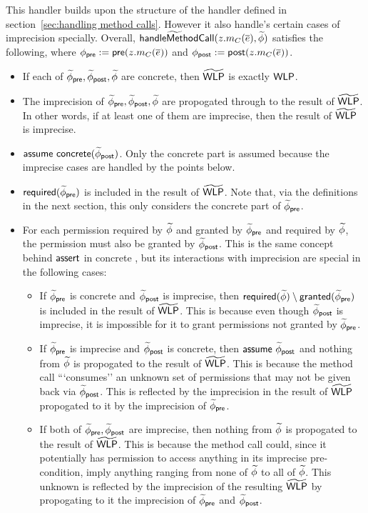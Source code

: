 This handler builds upon the structure of the handler defined in section~\ref{sec:handling method calls}. However it also handle's certain cases of imprecision specially. Overall, $\textsf{handle}\widetilde{\textsf{Met}}\textsf{hodCall}(z.m_C(\overline{e}), \widetilde{\phi})$ satisfies the following, where $\phi_\textsf{pre} := \textsf{pre}(z.m_C(\overline{e}))$ and $\phi_\textsf{post} := \textsf{post}(z.m_C(\overline{e}))$.
\begin{itemize}

\item
  If each of $\widetilde{\phi}_\textsf{pre}, \widetilde{\phi}_\textsf{post}, \widetilde{\phi}$ are concrete, then $\widetilde{\textsf{WLP}}$ is exactly $\textsf{WLP}$.

\item
  The imprecision of $\widetilde{\phi}_\textsf{pre}, \widetilde{\phi}_\textsf{post}, \widetilde{\phi}$ are propogated through to the result of $\widetilde{\textsf{WLP}}$. In other words, if at least one of them are imprecise, then the result of $\widetilde{\textsf{WLP}}$ is imprecise.

\item
  $\tsf{assume} \ \conc{\tphi_\post}$. Only the concrete part is assumed because the imprecise cases are handled by the points below.

\item
  $\textsf{required}(\widetilde{\phi}_\textsf{pre})$ is included in the result of $\widetilde{\textsf{WLP}}$. Note that, via the definitions in the next section, this only considers the concrete part of $\widetilde{\phi}_\textsf{pre}$.

\item
  For each permission required by $\widetilde{\phi}$ and granted by $\widetilde{\phi}_\textsf{pre}$ and required by $\widetilde{\phi}$, the permission must also be granted by $\widetilde{\phi}_\textsf{post}$. This is the same concept behind $\textsf{assert}$ in concrete , but its interactions with imprecision are special in the following cases:
  \begin{itemize}
    \item
      If $\widetilde{\phi}_\textsf{pre}$ is concrete and $\widetilde{\phi}_\textsf{post}$ is imprecise, then $\textsf{required}(\widetilde{\phi}) \setminus \textsf{granted}(\widetilde{\phi}_\textsf{pre})$ is included in the result of $\widetilde{\textsf{WLP}}$. This is because even though $\widetilde{\phi}_\textsf{post}$ is imprecise, it is impossible for it to grant permissions not granted by $\widetilde{\phi}_\textsf{pre}$.

    \item
      If $\widetilde{\phi}_\textsf{pre}$ is imprecise and $\widetilde{\phi}_\textsf{post}$ is concrete, then $\textsf{assume} \ \widetilde{\phi}_\textsf{post}$ and nothing from $\widetilde{\phi}$ is propogated to the result of $\widetilde{\textsf{WLP}}$. This is because the method call ```consumes'' an unknown set of permissions that may not be given back via $\widetilde{\phi}_\textsf{post}$. This is reflected by the imprecision in the result of $\widetilde{\textsf{WLP}}$ propogated to it by the imprecision of $\widetilde{\phi}_\textsf{pre}$.

    \item
      If both of $\widetilde{\phi}_\textsf{pre}, \widetilde{\phi}_\textsf{post}$ are imprecise, then nothing from $\widetilde{\phi}$ is propogated to the result of $\widetilde{\textsf{WLP}}$. This is because the method call could, since it potentially has permission to access anything in its imprecise pre-condition, imply anything ranging from none of $\widetilde{\phi}$ to all of $\widetilde{\phi}$. This unknown is reflected by the imprecision of the resulting $\widetilde{\textsf{WLP}}$ by propogating to it the imprecision of $\widetilde{\phi}_\textsf{pre}$ and $\widetilde{\phi}_\textsf{post}$.
  \end{itemize}

\end{itemize}

